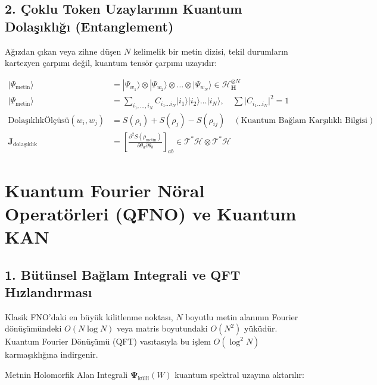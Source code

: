 \documentclass[11pt, a4paper]{article}
\begin{document}
\subsection{2. Çoklu Token Uzaylarının Kuantum Dolaşıklığı (Entanglement)}
Ağızdan çıkan veya zihne düşen $N$ kelimelik bir metin dizisi, tekil durumların kartezyen çarpımı değil, kuantum tensör çarpımı uzayıdır:

\begin{align}
|\Psi_{\text{metin}}\rangle &= |\Psi_{w_1}\rangle \otimes |\Psi_{w_2}\rangle \otimes \dots \otimes |\Psi_{w_N}\rangle \in \mathcal{H}_{\mathbf{H}}^{\otimes N} \\
|\Psi_{\text{metin}}\rangle &= \sum_{i_1, \dots, i_N} C_{i_1 \dots i_N} |i_1\rangle |i_2\rangle \dots |i_N\rangle, \quad \sum |C_{i_1 \dots i_N}|^2 = 1 \\
\text{DolaşıklıkÖlçüsü}(w_i, w_j) &= S(\rho_i) + S(\rho_j) - S(\rho_{ij}) \quad (\text{Kuantum Bağlam Karşılıklı Bilgisi}) \\
\mathbf{J}_{\text{dolaşıklık}} &= \left[ \frac{\partial^2 S(\rho_{\text{metin}})}{\partial \theta_a \partial \theta_b} \right]_{ab} \in \mathcal{T}^*\mathcal{H} \otimes \mathcal{T}^*\mathcal{H}
\end{align}

\section{Kuantum Fourier Nöral Operatörleri (QFNO) ve Kuantum KAN}

\subsection{1. Bütünsel Bağlam Integrali ve QFT Hızlandırması}
Klasik FNO'daki en büyük kilitlenme noktası, $N$ boyutlu metin alanının Fourier dönüşümündeki $O(N \log N)$ veya matris boyutundaki $O(N^2)$ yüküdür. Kuantum Fourier Dönüşümü (QFT) vasıtasıyla bu işlem $O(\log^2 N)$ karmaşıklığına indirgenir.

Metnin Holomorfik Alan Integrali $\mathbf{\Psi}_{\text{küllî}}(W)$ kuantum spektral uzayına aktarılır:
\end{document}
